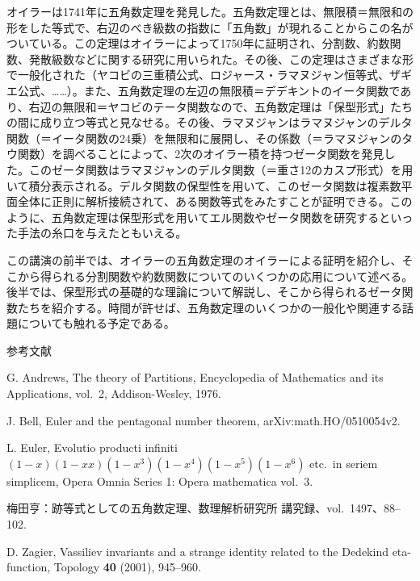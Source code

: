 \documentclass[uplatex,dvipdfmx]{jlreq}
\begin{document}
オイラーは1741年に五角数定理を発見した。五角数定理とは、無限積＝無限和の形をした等式で、右辺のべき級数の指数に「五角数」が現れることからこの名がついている。この定理はオイラーによって1750年に証明され、分割数、約数関数、発散級数などに関する研究に用いられた。その後、この定理はさまざまな形で一般化された（ヤコビの三重積公式、ロジャース・ラマヌジャン恒等式、ザギエ公式、……）。また、五角数定理の左辺の無限積＝デデキントのイータ関数であり、右辺の無限和＝ヤコビのテータ関数なので、五角数定理は「保型形式」たちの間に成り立つ等式と見なせる。その後、ラマヌジャンはラマヌジャンのデルタ関数（＝イータ関数の24乗）を無限和に展開し、その係数（＝ラマヌジャンのタウ関数）を調べることによって、2次のオイラー積を持つゼータ関数を発見した。このゼータ関数はラマヌジャンのデルタ関数（＝重さ12のカスプ形式）を用いて積分表示される。デルタ関数の保型性を用いて、このゼータ関数は複素数平面全体に正則に解析接続されて、ある関数等式をみたすことが証明できる。このように、五角数定理は保型形式を用いてエル関数やゼータ関数を研究するといった手法の糸口を与えたともいえる。

この講演の前半では、オイラーの五角数定理のオイラーによる証明を紹介し、そこから得られる分割関数や約数関数についてのいくつかの応用について述べる。後半では、保型形式の基礎的な理論について解説し、そこから得られるゼータ関数たちを紹介する。時間が許せば、五角数定理のいくつかの一般化や関連する話題についても触れる予定である。

\begin{center}\textsc{参考文献}\end{center}
\begin{enumerate}[{[1]}]
  \item G. Andrews, The theory of Partitions, Encyclopedia of Mathematics and its Applications, vol.~2, Addison-Wesley, 1976.
  \item J. Bell, Euler and the pentagonal number theorem, arXiv:math.HO/0510054v2.
  \item L. Euler, Evolutio producti infiniti $(1-x)(1-xx)(1-x^3)(1-x^4)(1-x^5)(1-x^6)$ etc.\ in seriem simplicem, Opera Omnia Series 1: Opera mathematica vol.~3.
  \item 梅田亨：跡等式としての五角数定理、数理解析研究所 講究録、vol.~1497、88--102.
  \item D. Zagier, Vassiliev invariants and a strange identity related to the Dedekind eta-function, Topology \textbf{40} (2001), 945--960.
\end{enumerate}
\end{document}
